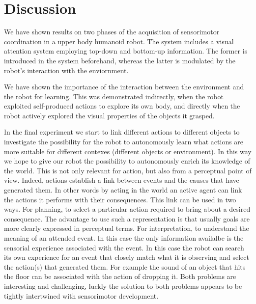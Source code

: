 \section{Discussion}
We have shown results on two phases of the acquisition of sensorimotor coordination in a upper body humanoid robot. The system includes a visual attention system employing top-down and bottom-up information. The former is introduced in the system beforehand, whereas the latter is modulated by the robot's interaction with the enviornment. 

We have shown the importance of the interaction between the environment and the robot for learning. This was demonstrated indirectly, when the robot exploited self-produced actions to explore its own body, and directly when the robot actively explored the visual properties of the objects it grasped.

In the final experiment we start to link different actions to different objects to investigate the possibility for the robot to autonomously learn what actions are more suitable for different contexes (different objects or environment). In this way we hope to give our robot the possibility to autonomously enrich its knowledge of the world. This is not only relevant for action, but also from a perceptual point of view. Indeed, actions establish a link between events and the causes that have generated them. In other words by acting in the world an active agent can link the actions it performs with their consequences. This link can be used in two ways. For planning, to select a particular action required to bring about a desired consequence. The advantage to use such a representation is that usually goals are more clearly expressed in perceptual terms. For interpretation, to understand the meaning of an attended event. In this case the only information availalbe is the sensorial experience associated with the event. In this case the robot can search its own experience for an event that closely match what it is observing and select the action(s) that generated them. For example the sound of an object that hits the floor can be associated with the action of dropping it. Both problems are interesting and challenging, luckly the solution to both problems appears to be tightly intertwined with sensorimotor development.

